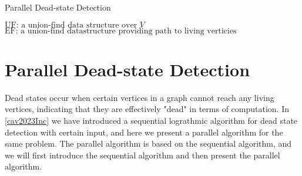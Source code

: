 
\begin{algorithm}[H]
    \caption{Parallel Dead-state Detection}
    $\mbox{UF: a union-find data structure over }V$ \\
    $\mbox{EF: a union-find datastructure providing path to living verticies}$ \\
    \label{alg:parallel_dead_state_detection}
\end{algorithm}
\section{Parallel Dead-state Detection}
Dead states occur when certain vertices in a graph cannot reach any living vertices, indicating that they are effectively "dead" in terms of computation. In \ref{cav2023Inc} we have introduced a sequential lograthmic algorithm for dead state detection with certain input, and here we present a parallel algorithm for the same problem. The parallel algorithm is based on the sequential algorithm, and we will first introduce the sequential algorithm and then present the parallel algorithm.

